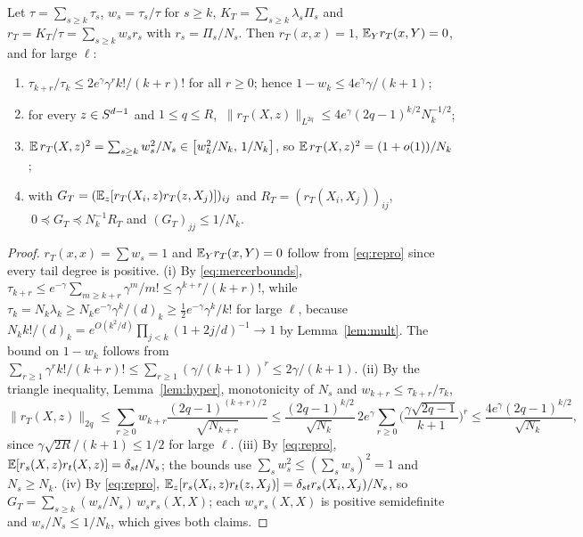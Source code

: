 \begin{lemma}\label{lem:tail}
Let $\tau=\sum_{s\ge k}\tau_s$, $w_s=\tau_s/\tau$ for $s\ge k$, $K_T=\sum_{s\ge k}\lambda_s\Pi_s$ and
$r_T=K_T/\tau=\sum_{s\ge k}w_sr_s$ with $r_s=\Pi_s/N_s$. Then $r_T(x,x)=1$, $\mathbb{E}_Yr_T(x,Y)=0$, and for large $\ell$:
\begin{enumerate}
\item[\textup{(i)}] $\tau_{k+r}/\tau_k\le2e^{\gamma}\gamma^rk!/(k+r)!$ for all $r\ge0$; hence $1-w_k\le4e^\gamma\gamma/(k+1)$;
\item[\textup{(ii)}] for every $z\in S^{d-1}$ and $1\le q\le R$, $\ \|r_T(X,z)\|_{L^{2q}}\le4e^{\gamma}(2q-1)^{k/2}N_k^{-1/2}$;
\item[\textup{(iii)}] $\mathbb{E}\,r_T(X,z)^2=\sum_{s\ge k}w_s^2/N_s\in\big[w_k^2/N_k,\,1/N_k\big]$, so $\mathbb{E}\,r_T(X,z)^2=(1+o(1))/N_k$;
\item[\textup{(iv)}] with $G_T=(\mathbb{E}_z[r_T(X_i,z)r_T(z,X_j)])_{ij}$ and $R_T=(r_T(X_i,X_j))_{ij}$,
$\ 0\preceq G_T\preceq N_k^{-1}R_T$ and $(G_T)_{jj}\le1/N_k$.
\end{enumerate}
\end{lemma}

\begin{proof}
$r_T(x,x)=\sum w_s=1$ and $\mathbb{E}_Yr_T(x,Y)=0$ follow from \eqref{eq:repro} since every tail degree is positive.
(i) By \eqref{eq:mercerbounds}, $\tau_{k+r}\le e^{-\gamma}\sum_{m\ge k+r}\gamma^m/m!\le\gamma^{k+r}/(k+r)!$,
while $\tau_k=N_k\lambda_k\ge N_ke^{-\gamma}\gamma^k/(d)_k\ge\frac12e^{-\gamma}\gamma^k/k!$ for large $\ell$, because
$N_kk!/(d)_k=e^{O(k^2/d)}\prod_{j<k}(1+2j/d)^{-1}\to1$ by Lemma~\ref{lem:mult}. The bound on $1-w_k$
follows from $\sum_{r\ge1}\gamma^rk!/(k+r)!\le\sum_{r\ge1}(\gamma/(k+1))^r\le2\gamma/(k+1)$.
(ii) By the triangle inequality, Lemma~\ref{lem:hyper}, monotonicity of $N_s$ and $w_{k+r}\le\tau_{k+r}/\tau_k$,
\[
\|r_T(X,z)\|_{2q}\le\sum_{r\ge0}w_{k+r}\frac{(2q-1)^{(k+r)/2}}{\sqrt{N_{k+r}}}
\le\frac{(2q-1)^{k/2}}{\sqrt{N_k}}\,2e^{\gamma}\sum_{r\ge0}\Big(\frac{\gamma\sqrt{2q-1}}{k+1}\Big)^r
\le\frac{4e^{\gamma}(2q-1)^{k/2}}{\sqrt{N_k}},
\]
since $\gamma\sqrt{2R}/(k+1)\le1/2$ for large $\ell$. (iii) By \eqref{eq:repro}, $\mathbb{E}[r_s(X,z)r_t(X,z)]=\delta_{st}/N_s$;
the bounds use $\sum_sw_s^2\le(\sum_sw_s)^2=1$ and $N_s\ge N_k$. (iv) By \eqref{eq:repro},
$\mathbb{E}_z[r_s(X_i,z)r_t(z,X_j)]=\delta_{st}r_s(X_i,X_j)/N_s$, so $G_T=\sum_{s\ge k}(w_s/N_s)\,w_sr_s(X,X)$; each
$w_sr_s(X,X)$ is positive semidefinite and $w_s/N_s\le1/N_k$, which gives both claims.
\end{proof}


